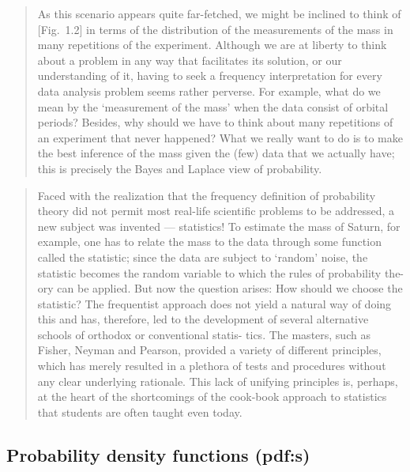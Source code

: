 \documentclass[%
oneside,                 %
final,                   %
10pt]{article}
\begin{document}

\begin{quote}
As this scenario appears quite far-fetched, we might be inclined to think of [Fig.~1.2] in terms of the distribution of the measurements of the mass in many repetitions of the experiment. Although we are at liberty to think about a problem in any way that facilitates its solution, or our understanding of it, having to seek a frequency interpretation for every data analysis problem seems rather perverse.
For example, what do we mean by the ‘measurement of the mass’ when the data consist of orbital periods? Besides, why should we have to think about many repetitions of an experiment that never happened? What we really want to do is to make the best inference of the mass given the (few) data that we actually have; this is precisely the Bayes and Laplace view of probability.
\end{quote}



\begin{quote}
Faced with the realization that the frequency definition of probability theory did not permit most real-life scientific problems to be addressed, a new subject was invented — statistics! To estimate the mass of Saturn, for example, one has to relate the mass to the data through some function called the statistic; since the data are subject to ‘random’ noise, the statistic becomes the random variable to which the rules of probability the- ory can be applied. But now the question arises: How should we choose the statistic? The frequentist approach does not yield a natural way of doing this and has, therefore, led to the development of several alternative schools of orthodox or conventional statis- tics. The masters, such as Fisher, Neyman and Pearson, provided a variety of different principles, which has merely resulted in a plethora of tests and procedures without any clear underlying rationale. This lack of unifying principles is, perhaps, at the heart of the shortcomings of the cook-book approach to statistics that students are often taught even today.
\end{quote}


\subsection{Probability density functions (pdf:s)}
\end{document}
